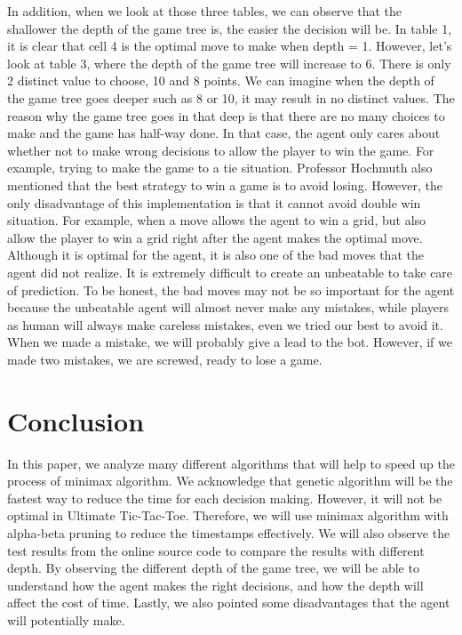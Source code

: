 \documentclass[12pt]{article}
\begin{document}
In addition, when we look at those three tables, we can observe that the shallower the depth of the game tree is, the easier the decision will be. In table 1, it is clear that cell 4 is the optimal move to make when depth = 1. However, let's look at table 3, where the depth of the game tree will increase to 6. There is only 2 distinct value to choose, 10 and 8 points. We can imagine when the depth of the game tree goes deeper such as 8 or 10, it may result in no distinct values. The reason why the game tree goes in that deep is that there are no many choices to make and the game has half-way done. In that case, the agent only cares about whether not to make wrong decisions to allow the player to win the game. For example, trying to make the game to a tie situation. Professor Hochmuth also mentioned that the best strategy to win a game is to avoid losing.\cite{hochmuth_2003} However, the only disadvantage of this implementation is that it cannot avoid double win situation. For example, when a move allows the agent to win a grid, but also allow the player to win a grid right after the agent makes the optimal move. Although it is optimal for the agent, it is also one of the bad moves that the agent did not realize. It is extremely difficult to create an unbeatable to take care of prediction. To be honest, the bad moves may not be so important for the agent because the unbeatable agent will almost never make any mistakes, while players as human will always make careless mistakes, even we tried our best to avoid it. When we made a mistake, we will probably give a lead to the bot. However, if we made two mistakes, we are screwed, ready to lose a game.
\section{Conclusion}
In this paper, we analyze many different algorithms that will help to speed up the process of minimax algorithm. We acknowledge that genetic algorithm will be the fastest way to reduce the time for each decision making. However, it will not be optimal in Ultimate Tic-Tac-Toe. Therefore, we will use minimax algorithm with alpha-beta pruning to reduce the timestamps effectively. We will also observe the test results from the online source code to compare the results with different depth. By observing the different depth of the game tree, we will be able to understand how the agent makes the right decisions, and how the depth will affect the cost of time. Lastly, we also pointed some disadvantages that the agent will potentially make.
\newpage


\cite{*}
\end{document}
